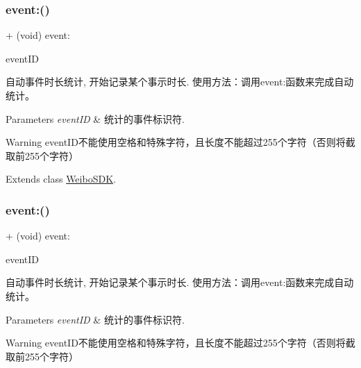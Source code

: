 \mbox{\label{category_weibo_s_d_k_07_statistics_08_af035b5557e6dd544e282689323d8c4aa}} 
\subsubsection{\texorpdfstring{event\+:()}{event:()}\hspace{0.1cm}{\footnotesize\ttfamily [1/3]}}
{\footnotesize\ttfamily + (void) event\+: \begin{DoxyParamCaption}\item[{(N\+S\+String $\ast$)}]{event\+ID }\end{DoxyParamCaption}}

自动事件时长统计, 开始记录某个事示时长. 使用方法：调用event\+:函数来完成自动统计。 
\begin{DoxyParams}{Parameters}
{\em event\+ID} & 统计的事件标识符. \\
\hline
\end{DoxyParams}
\begin{DoxyWarning}{Warning}
event\+I\+D不能使用空格和特殊字符，且长度不能超过255个字符（否则将截取前255个字符） 
\end{DoxyWarning}


Extends class \mbox{\hyperlink{interface_weibo_s_d_k_af035b5557e6dd544e282689323d8c4aa}{Weibo\+S\+DK}}.

\mbox{\label{category_weibo_s_d_k_07_statistics_08_af035b5557e6dd544e282689323d8c4aa}} 
\subsubsection{\texorpdfstring{event\+:()}{event:()}\hspace{0.1cm}{\footnotesize\ttfamily [2/3]}}
{\footnotesize\ttfamily + (void) event\+: \begin{DoxyParamCaption}\item[{(N\+S\+String $\ast$)}]{event\+ID }\end{DoxyParamCaption}}

自动事件时长统计, 开始记录某个事示时长. 使用方法：调用event\+:函数来完成自动统计。 
\begin{DoxyParams}{Parameters}
{\em event\+ID} & 统计的事件标识符. \\
\hline
\end{DoxyParams}
\begin{DoxyWarning}{Warning}
event\+I\+D不能使用空格和特殊字符，且长度不能超过255个字符（否则将截取前255个字符） 
\end{DoxyWarning}


